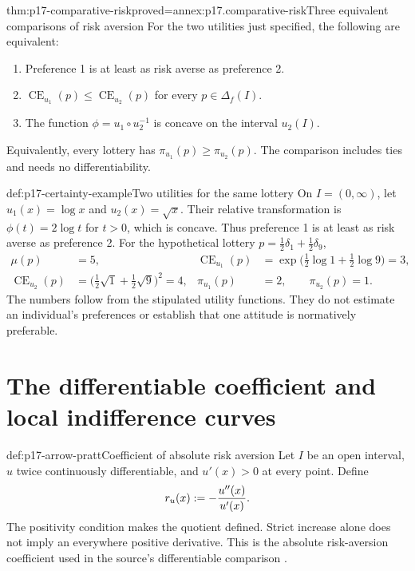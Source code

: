 \begin{hbtheorem}{thm:p17-comparative-risk}{proved=annex:p17.comparative-risk}{Three equivalent comparisons of risk aversion}
For the two utilities just specified, the following are equivalent:
\begin{enumerate}
\item Preference 1 is at least as risk averse as preference 2.
\item \(\operatorname{CE}_{u_1}(p)\leq\operatorname{CE}_{u_2}(p)\)
for every \(p\in\Delta_f(I)\).
\item The function \(\phi=u_1\circ u_2^{-1}\) is concave on
the interval \(u_2(I)\).
\end{enumerate}
Equivalently, every lottery has \(\pi_{u_1}(p)\geq\pi_{u_2}(p)\).
The comparison includes ties and needs no differentiability.
\end{hbtheorem}

\begin{hbexample}{def:p17-certainty-example}{Two utilities for the same lottery}
On \(I=(0,\infty)\), let \(u_1(x)=\log x\) and \(u_2(x)=\sqrt x\).
Their relative transformation is \(\phi(t)=2\log t\) for \(t>0\),
which is concave. Thus preference 1 is at least as risk averse as
preference 2. For the hypothetical lottery
\(p=\tfrac12\delta_1+\tfrac12\delta_9\),
\[
\begin{aligned}
 \mu(p)&=5,&
 \operatorname{CE}_{u_1}(p)&=\exp\bigl(\tfrac12\log1+\tfrac12\log9\bigr)=3,\\
 \operatorname{CE}_{u_2}(p)&=\bigl(\tfrac12\sqrt1+\tfrac12\sqrt9\bigr)^2=4,&
 \pi_{u_1}(p)&=2,\qquad \pi_{u_2}(p)=1.
\end{aligned}
\]
The numbers follow from the stipulated utility functions. They do not
estimate an individual's preferences or establish that one attitude is
normatively preferable.
\end{hbexample}

\section{The differentiable coefficient and local indifference curves}
\label{sec:p17-absolute-risk-aversion}

\begin{hbdefinition}{def:p17-arrow-pratt}{Coefficient of absolute risk aversion}
Let \(I\) be an open interval, \(u\) twice continuously differentiable,
and \(u'(x)>0\) at every point. Define
\[
                             r_u(x)\mathrel{:=}-\frac{u''(x)}{u'(x)}.
\]
The positivity condition makes the quotient defined. Strict increase
alone does not imply an everywhere positive derivative. This is the
absolute risk-aversion coefficient used in the source's differentiable
comparison \cite[p.~114]{Rubinstein2015LectureNotes}.
\end{hbdefinition}


